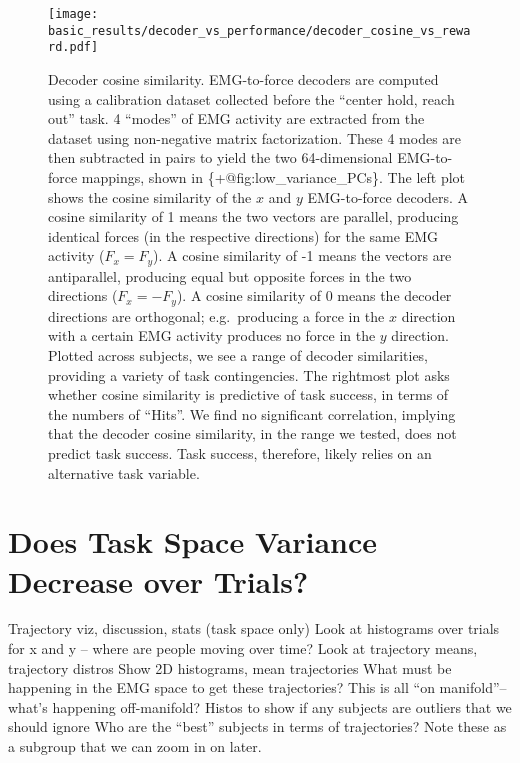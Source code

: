 \documentclass[../main.tex]{subfiles}
\begin{document}
\begin{figure}[tph]
    \centering
    \texttt{[image: basic\_results/decoder\_vs\_performance/decoder\_cosine\_vs\_reward.pdf]}
    \caption[Decoder axis similarity versus reward]{Decoder cosine similarity. EMG-to-force decoders are computed using a calibration dataset collected before the ``center hold, reach out'' task. 4 ``modes'' of EMG activity are extracted from the dataset using non-negative matrix factorization. These 4 modes are then subtracted in pairs to yield the two 64-dimensional EMG-to-force mappings, shown in \{+@fig:low\_variance\_PCs\}. The left plot shows the cosine similarity of the $x$ and $y$ EMG-to-force decoders. A cosine similarity of 1 means the two vectors are parallel, producing identical forces (in the respective directions) for the same EMG activity ($F_x = F_y$). A cosine similarity of -1 means the vectors are antiparallel, producing equal but opposite forces in the two directions ($F_x = -F_y$). A cosine similarity of 0 means the decoder directions are orthogonal; e.g.~producing a force in the $x$ direction with a certain EMG activity produces no force in the $y$ direction. Plotted across subjects, we see a range of decoder similarities, providing a variety of task contingencies. The rightmost plot asks whether cosine similarity is predictive of task success, in terms of the numbers of ``Hits''. We find no significant correlation, implying that the decoder cosine similarity, in the range we tested, does not predict task success. Task success, therefore, likely relies on an alternative task variable.}\label{fig:decoder_cosine_vs_reward}
\end{figure}



\section{Does Task Space Variance Decrease over Trials?}

Trajectory viz, discussion, stats (task space only)
Look at histograms over trials for x and y – where are people moving over time?
Look at trajectory means, trajectory distros
Show 2D histograms, mean trajectories
What must be happening in the EMG space to get these trajectories?
This is all “on manifold”-- what’s happening off-manifold?
Histos to show if any subjects are outliers that we should ignore
Who are the “best” subjects in terms of trajectories? Note these as a subgroup that we can zoom in on later.
\end{document}
